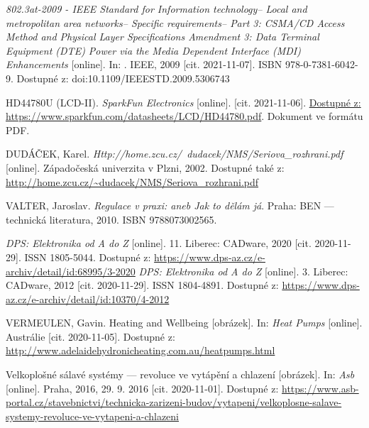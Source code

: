 \begin{thebibliography}{3}
\textit{802.3at-2009 - IEEE Standard for Information technology-- Local and metropolitan area networks-- Specific requirements-- Part 3: CSMA/CD Access Method and Physical Layer Specifications Amendment 3: Data Terminal Equipment (DTE) Power via the Media Dependent Interface (MDI) Enhancements} [online]. In: . IEEE, 2009 [cit. 2021-11-07]. ISBN 978-0-7381-6042-9. Dostupné z: doi:10.1109/IEEESTD.2009.5306743


HD44780U (LCD-II). \textit{SparkFun Electronics} [online]. [cit. 2021-11-06]. \url{Dostupné z: https://www.sparkfun.com/datasheets/LCD/HD44780.pdf}. Dokument ve formátu PDF.

DUDÁČEK, Karel. \textit{Http://home.zcu.cz/~dudacek/NMS/Seriova\_rozhrani.pdf} [online]. Západočeská univerzita v Plzni, 2002. Dostupné také z: \url{http://home.zcu.cz/~dudacek/NMS/Seriova\_rozhrani.pdf}


VALTER, Jaroslav. \textit{Regulace v praxi: aneb Jak to dělám já}. Praha: BEN --- technická literatura, 2010. ISBN 9788073002565.

\textit{DPS: Elektronika od A do Z} [online]. 11. Liberec: CADware, 2020 [cit. 2020-11-29]. ISSN 1805-5044. Dostupné z: \url{https://www.dps-az.cz/e-archiv/detail/id:68995/3-2020}
\textit{DPS: Elektronika od A do Z} [online]. 3. Liberec: CADware, 2012 [cit. 2020-11-29]. ISSN 1804-4891. Dostupné z: \url{https://www.dps-az.cz/e-archiv/detail/id:10370/4-2012}


VERMEULEN, Gavin. Heating and Wellbeing [obrázek]. In: \textit{Heat Pumps} [online]. Austrálie [cit. 2020-11-05]. Dostupné z: \url{http://www.adelaidehydronicheating.com.au/heatpumps.html}

Velkoplošné sálavé systémy --- revoluce ve vytápění a chlazení [obrázek]. In: \textit{Asb} [online]. Praha, 2016, 29. 9. 2016 [cit. 2020-11-01]. Dostupné z: \url{https://www.asb-portal.cz/stavebnictvi/technicka-zarizeni-budov/vytapeni/velkoplosne-salave-systemy-revoluce-ve-vytapeni-a-chlazeni}


\end{thebibliography}
